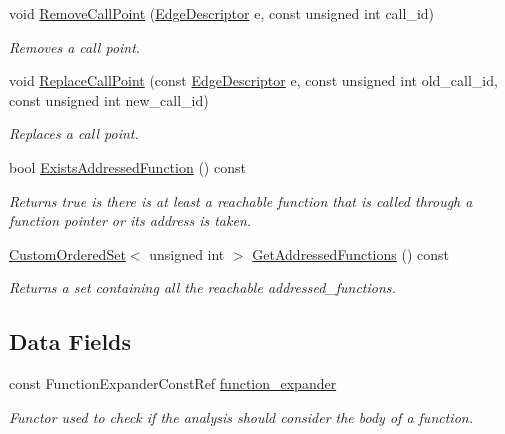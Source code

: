 \begin{DoxyCompactItemize}
void \hyperlink{classCallGraphManager_abbcca062dd81ae6a267d3eabe1a326fb}{Remove\+Call\+Point} (\hyperlink{graph_8hpp_a9eb9afea34e09f484b21f2efd263dd48}{Edge\+Descriptor} e, const unsigned int call\+\_\+id)
\begin{DoxyCompactList}\small\item\em Removes a call point. \end{DoxyCompactList}\item 
void \hyperlink{classCallGraphManager_a89010b404b275f6edc07b8c1f406d842}{Replace\+Call\+Point} (const \hyperlink{graph_8hpp_a9eb9afea34e09f484b21f2efd263dd48}{Edge\+Descriptor} e, const unsigned int old\+\_\+call\+\_\+id, const unsigned int new\+\_\+call\+\_\+id)
\begin{DoxyCompactList}\small\item\em Replaces a call point. \end{DoxyCompactList}\item 
bool \hyperlink{classCallGraphManager_ae5a29d3415ff94c66e96912328b871d7}{Exists\+Addressed\+Function} () const
\begin{DoxyCompactList}\small\item\em Returns true is there is at least a reachable function that is called through a function pointer or its address is taken. \end{DoxyCompactList}\item 
\hyperlink{classCustomOrderedSet}{Custom\+Ordered\+Set}$<$ unsigned int $>$ \hyperlink{classCallGraphManager_af2f8989f8165d380da23840418d37c14}{Get\+Addressed\+Functions} () const
\begin{DoxyCompactList}\small\item\em Returns a set containing all the reachable addressed\+\_\+functions. \end{DoxyCompactList}\end{DoxyCompactItemize}
\subsection*{Data Fields}
\begin{DoxyCompactItemize}
\item 
const Function\+Expander\+Const\+Ref \hyperlink{classCallGraphManager_a5ce1c00a1075535b68287a08e3fd6b1b}{function\+\_\+expander}
\begin{DoxyCompactList}\small\item\em Functor used to check if the analysis should consider the body of a function. \end{DoxyCompactList}\end{DoxyCompactItemize}
